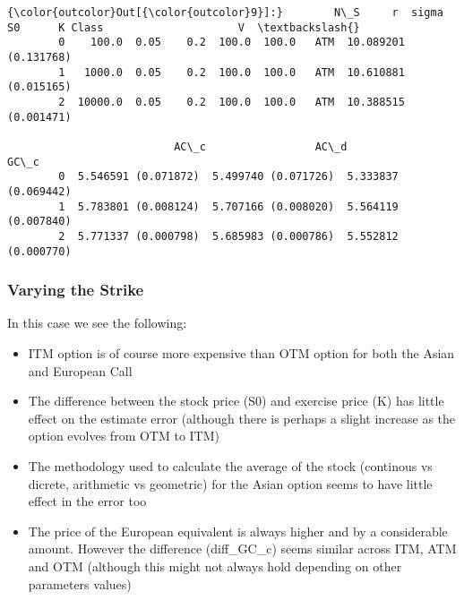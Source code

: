\documentclass{article}
\providecommand{\tightlist}{%
      \setlength{\itemsep}{0pt}\setlength{\parskip}{0pt}}
\begin{document}
            \begin{Verbatim}[commandchars=\\\{\}]
{\color{outcolor}Out[{\color{outcolor}9}]:}        N\_S     r  sigma     S0      K Class                     V  \textbackslash{}
        0    100.0  0.05    0.2  100.0  100.0   ATM  10.089201 (0.131768)   
        1   1000.0  0.05    0.2  100.0  100.0   ATM  10.610881 (0.015165)   
        2  10000.0  0.05    0.2  100.0  100.0   ATM  10.388515 (0.001471)   
        
                          AC\_c                 AC\_d                 GC\_c  
        0  5.546591 (0.071872)  5.499740 (0.071726)  5.333837 (0.069442)  
        1  5.783801 (0.008124)  5.707166 (0.008020)  5.564119 (0.007840)  
        2  5.771337 (0.000798)  5.685983 (0.000786)  5.552812 (0.000770)  
\end{Verbatim}
        
    \subsubsection{Varying the Strike}\label{varying-the-strike}

In this case we see the following:

\begin{itemize}
\tightlist
\item
  ITM option is of course more expensive than OTM option for both the
  Asian and European Call
\item
  The difference between the stock price (S0) and exercise price (K) has
  little effect on the estimate error (although there is perhaps a
  slight increase as the option evolves from OTM to ITM)
\item
  The methodology used to calculate the average of the stock (continous
  vs dicrete, arithmetic vs geometric) for the Asian option seems to
  have little effect in the error too
\item
  The price of the European equivalent is always higher and by a
  considerable amount. However the difference (diff\_GC\_c) seems similar
  across ITM, ATM and OTM (although this might not always hold
  depending on other parameters values)
\end{itemize}
\end{document}
